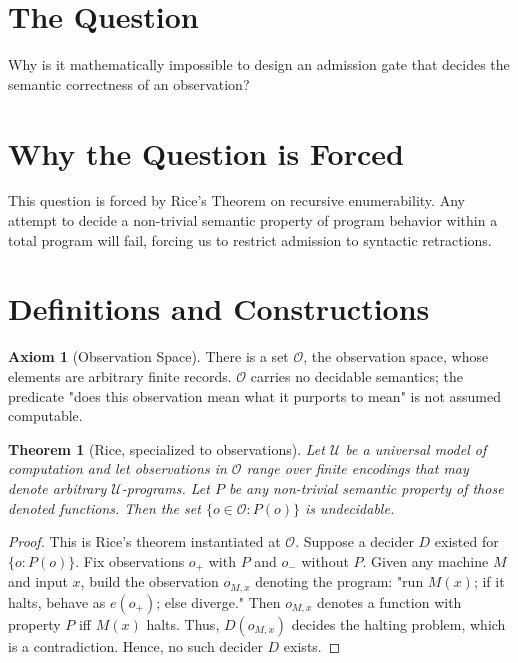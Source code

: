 \documentclass[11pt,oneside]{book}
\theoremstyle{definition}
\newtheorem{axiom}{Axiom}[chapter]
\theoremstyle{plain}
\newtheorem{theorem}{Theorem}[chapter]
\theoremstyle{remark}
\newcommand{\Obs}{\mathcal{O}}                 %
\begin{document}
\section{The Question}
Why is it mathematically impossible to design an admission gate that decides the semantic correctness of an observation? %

\section{Why the Question is Forced}
This question is forced by Rice's Theorem on recursive enumerability. %
Any attempt to decide a non-trivial semantic property of program behavior within a total program will fail, forcing us to restrict admission to syntactic retractions. %

\section{Definitions and Constructions}

\begin{axiom}[Observation Space]\label{ax:obs_space}
There is a set $\Obs$, the observation space, whose elements are arbitrary finite records. %
$\Obs$ carries no decidable semantics; the predicate "does this observation mean what it purports to mean" is not assumed computable. %
\end{axiom}

\begin{theorem}[Rice, specialized to observations]\label{thm:rice_specialized}
Let $\mathcal{U}$ be a universal model of computation and let observations in $\Obs$ range over finite encodings that may denote arbitrary $\mathcal{U}$-programs. %
Let $P$ be any non-trivial semantic property of those denoted functions. %
Then the set $\{o\in\Obs : P(o)\}$ is undecidable. %
\end{theorem}

\begin{proof}
This is Rice's theorem \cite{rice1953} instantiated at $\Obs$. %
Suppose a decider $D$ existed for $\{o:P(o)\}$. %
Fix observations $o_{+}$ with $P$ and $o_{-}$ without $P$. %
Given any machine $M$ and input $x$, build the observation $o_{M,x}$ denoting the program: "run $M(x)$; if it halts, behave as $e(o_{+})$; else diverge." %
Then $o_{M,x}$ denotes a function with property $P$ iff $M(x)$ halts. %
Thus, $D(o_{M,x})$ decides the halting problem, which is a contradiction. %
Hence, no such decider $D$ exists. %
\end{proof}
\end{document}
